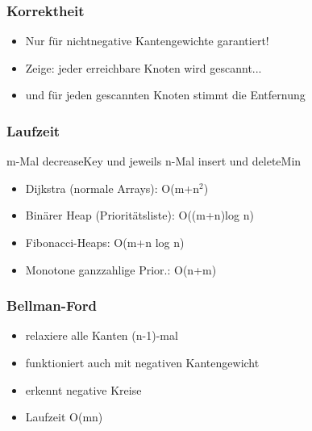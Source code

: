 \begin{frame}
\frametitle{Korrektheit}
\begin{itemize}
\item Nur für nichtnegative Kantengewichte garantiert!\pause
\item Zeige: jeder erreichbare Knoten wird gescannt...
\item und für jeden gescannten Knoten stimmt die Entfernung
\end{itemize}
\end{frame}

\begin{frame}
\frametitle{Laufzeit}
m-Mal decreaseKey und jeweils n-Mal insert und deleteMin\pause
\begin{itemize}
\item Dijkstra (normale Arrays): O(m+n$^2$)
\item Binärer Heap (Prioritätsliste): O((m+n)log n)
\item Fibonacci-Heaps: O(m+n log n)\pause
\item Monotone ganzzahlige Prior.: O(n+m)
\end{itemize}
\end{frame}

\begin{frame}
\frametitle{Bellman-Ford}
\begin{itemize}
\item relaxiere alle Kanten (n-1)-mal
\item funktioniert auch mit negativen Kantengewicht
\item erkennt negative Kreise\pause
\item Laufzeit O(mn)
\end{itemize}
\end{frame}

